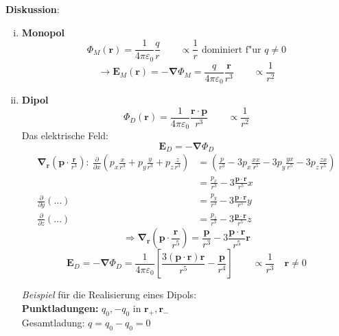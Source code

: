 \documentclass[titlepage,11pt,a4paper,ngerman]{report}
\renewcommand{\Phi}{\varPhi}
\renewcommand{\vec}[1]{\boldsymbol{#1}}
\renewcommand{\epsilon}{\varepsilon}
\begin{document}
\textbf{Diskussion}:
\begin{enumerate}[i)]
	\item \textbf{Monopol} \[\Phi_M(\vec{r})=\frac{1}{4\pi\epsilon_0}\frac{q}{r} \qquad \propto\frac{1}{r}\textrm{ dominiert f"ur }q\neq0\]
	\[\rightarrow\vec{E}_M(\vec{r})=-\vec{\nabla}\Phi_M=\frac{q}{4\pi\epsilon_0}\frac{\vec{r}}{r^3} \qquad \propto\frac{1}{r^2}\]
	\item \textbf{Dipol} \[\Phi_D(\vec{r})=\frac{1}{4\pi\epsilon_0}\frac{\vec{r}\cdot\vec{p}}{r^3} \qquad \propto\frac{1}{r^2}\]
	Das elektrische Feld:
	\[\vec{E}_D=-\vec{\nabla}\Phi_D\]
	\begin{align*}
	\vec{\nabla}_{\vec{r}} \left(\vec{p}\cdot\frac{\vec{r}}{r^3}\right) : \ \frac{\partial}{\partial x} \left(p_x\frac{x}{r^3}+p_y\frac{y}{r^3}+p_z\frac{z}{r^3}\right) &= \left(\frac{p}{r^3} -3 p_x \frac{xx}{r^5}-3p_y\frac{yx}{r^5} -3p_z \frac{zx}{r^5} \right)\\
	&= \frac{p_x}{r^3} -3 \frac{\vec{p}\cdot\vec{r}}{r^5}x\\
	\frac{\partial}{\partial y}(\ldots) &= \frac{p_y}{r^3}-3\frac{\vec{p}\cdot\vec{r}}{r^5}y \\
	\frac{\partial}{\partial z} (\ldots) &= \frac{p_z}{r^3} -3 \frac{\vec{p}\cdot\vec{r}}{r^5} z 
	\end{align*}
	\[\Rightarrow\vec{\nabla}_{\vec{r}}\left(\vec{p}\cdot\frac{\vec{r}}{r^5}\right)=\frac{\vec{p}}{r^3}-3\frac{\vec{p}\cdot\vec{r}}{r^5}\vec{r}\]
	$$\vec{E}_{D} = - \vec{\nabla} \Phi_D= \frac{1}{4\pi\epsilon_0} \left[\frac{3(\vec{p}\cdot\vec{r})\vec{r}}{r^5}-\frac{\vec{p}}{r^4}\right] \qquad \propto \frac{1}{r^3} \quad \vec{r}\neq0$$
	
	\begin{minipage}{.5\linewidth}
		\emph{Beispiel} für die Realisierung eines Dipols:\\
		\textbf{Punktladungen:} $q_0,-q_0$ in $\vec{r}_+,\vec{r}_-$\\
		Gesamtladung: $q=q_0-q_0=0$
	\end{minipage}
	\begin{minipage}{.5\linewidth}
		\centering
	\end{minipage}
	

\end{enumerate}
\end{document}
